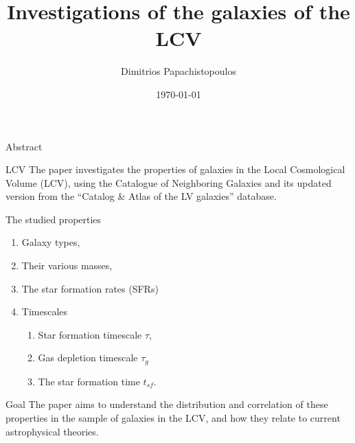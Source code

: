 \documentclass[presentation]{beamer}
\author{Dimitrios Papachistopoulos}
\date{\today}
\title{Investigations of the galaxies of the LCV}
\begin{document}
\maketitle




\begin{frame}[label={sec:org9d0b2d9}]{Abstract}
\begin{block}{LCV}
The paper investigates the properties of galaxies in the Local Cosmological Volume (LCV), using the Catalogue of Neighboring Galaxies\autocite{karachentsevUPDATEDNEARBYGALAXY2013} and its updated version from the ``Catalog \& Atlas of the LV galaxies'' database\autocite{CatalogLVGalaxies}.
\end{block}
\begin{block}{The studied properties}
\begin{enumerate}
\item Galaxy types,
\item Their various masses,
\item The star formation rates (SFRs)
\item Timescales
\begin{enumerate}
\item Star formation timescale \(\tau\),
\item Gas depletion timescale \(\tau_g\)
\item The star formation time \(t_{sf}\).
\end{enumerate}
\end{enumerate}
\end{block}
\begin{block}{Goal}
The paper aims to understand the distribution and correlation of these properties in the sample of galaxies in the LCV, and how they relate to current astrophysical theories.
\end{block}
\end{frame}
\end{document}
